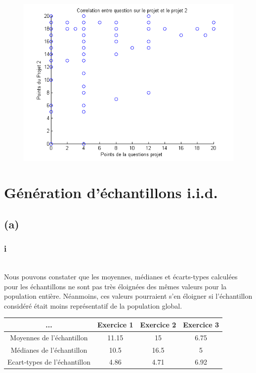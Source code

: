\documentclass[10pt,a4paper]{article}
\begin{document}
\begin{figure}[h]
\centering
\includegraphics[scale= 0.5]{1e_graphe.png}
\end{figure}




\section{Génération d'échantillons i.i.d.}
\subsection*{(a)}
\subsubsection*{i}
\ \\

Nous pouvons constater que les moyennes, médianes et écarts-types calculées pour les échantillons ne sont pas très éloignées des mêmes valeurs pour la population entière. Néanmoins, ces valeurs pourraient s'en éloigner si l'échantillon considéré était moins représentatif de la population global. 

\begin{center}
\begin{tabular}{|c|c|c|c|}
\hline
... & Exercice 1 & Exercice 2 & Exercice 3 \\
\hline
\hline
Moyennes de l'échantillon  & 11.15 & 15 & 6.75 \\
\hline
Médianes de l'échantillon  & 10.5 & 16.5 & 5 \\
\hline
Ecart-types de l'échantillon & 4.86 & 4.71 & 6.92 \\
\hline

\end{tabular}
\end{center}
\ \\
 
\end{document}
